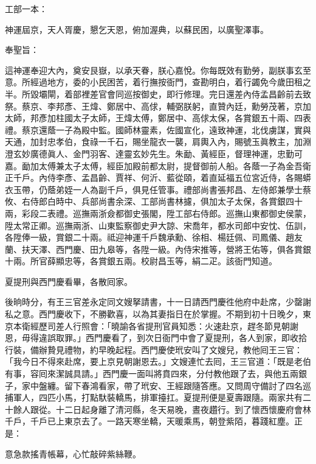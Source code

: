 \begin{myquote}[\markfont]
工部一本：

神運屆京，天人胥慶，懇乞天恩，俯加渥典，以蘇民困，以廣聖澤事。

奉聖旨：

這神運奉迎大內，奠安艮嶽，以承天眷，朕心嘉悅。你每既效有勤勞，副朕事玄至意。所經過地方，委的小民困苦，着行撫按衙門，查勘明白，着行蠲免今歲田租之半。所毀壩閘，着部裡差官會同巡按御史，即行修理。完日還差內侍孟昌齡前去致祭。蔡京、李邦彥、王煒、鄭居中、高俅，輔弼朕躬，直贊內廷，勳勞茂著，京加太師，邦彥加柱國太子太師，王煒太傅，鄭居中、高俅太保，各賞銀五十兩、四表禮。蔡京還蔭一子為殿中監。國師林靈素，佐國宣化，遠致神運，北伐虜謀，實與天通，加封忠孝伯，食祿一千石，賜坐龍衣一襲，肩輿入內，賜號玉眞教主，加淵澄玄妙廣德眞人、金門羽客、達靈玄妙先生。{}朱勔、黃經臣，督理神運，忠勤可嘉。勔加太傅兼太子太傅，經臣加殿前都太尉，提督御前人船。各蔭一子為金吾衛正千戶。內侍李彥、孟昌齡、賈祥、何沂、藍從頤，着直延福五位宮近侍，各賜蟒衣玉帶，仍蔭弟姪一人為副千戶，俱見任管事。禮部尚書張邦昌、左侍郎兼學士蔡攸、右侍郎白時中、兵部尚書余深、工部尚書林攄，俱加太子太保，各賞銀四十兩，彩段二表禮。巡撫兩浙僉都御史張閣，陞工部右侍郎。巡撫山東都御史侯蒙，陞太常正卿。巡撫兩浙、山東監察御史尹大諒、宋喬年，都水司郎中安忱、伍訓，各陞俸一級，賞銀二十兩。祗迎神運千戶魏承勳、徐相、楊廷佩、司鳳儀、趙友蘭、扶天澤、西門慶、田九皋等，各陞一級。內侍宋推等，營將王佑等，俱各賞銀十兩。所官薛顯忠等，各賞銀五兩。校尉昌玉等，絹二疋。該衙門知道。
\end{myquote} 

夏提刑與西門慶看畢，各散囘家。

後晌時分，有王三官差永定同文嫂拏請書，十一日請西門慶徃他府中赴席，少罄謝私之意。西門慶收下，不勝歡喜，以為其妻指日在於掌握。{}不期到初十日晚夕，東京本衛經歷司差人行照會：「曉諭各省提刑官員知悉：火速赴京，趕冬節見朝謝恩，毋得違誤取罪。」西門慶看了，到次日衙門中會了夏提刑，各人到家，即收拾行裝，備辦贄見禮物，約早晚起程。西門慶使玳安叫了文嫂兒，教他囘王三官：「我今日不得來赴席，要上京見朝謝恩去。」文嫂連忙去囘，王三官道：「既是老伯有事，容囘來潔誠具請。」西門慶一面叫將賁四來，分付教他跟了去，與他五兩銀子，家中盤纏。留下春鴻看家，帶了玳安、王經跟隨答應。又問周守備討了四名巡捕軍人，四匹小馬，打點馱裝轎馬，排軍擡扛。夏提刑便是夏壽跟隨。兩家共有二十餘人跟從。十二日起身離了清河縣，冬天易晚，晝夜趲行。到了懷西懷慶府會林千戶，千戶已上東京去了。一路天寒坐轎，天暖乘馬，朝登紫陌，暮踐紅塵。正是：

\begin{myquote}
意急款搖青帳幕，心忙敲碎紫絲鞭。
\end{myquote}

